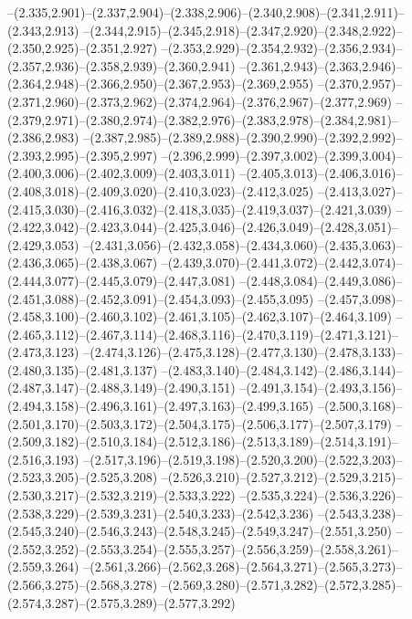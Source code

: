   --(2.335,2.901)--(2.337,2.904)--(2.338,2.906)--(2.340,2.908)--(2.341,2.911)--(2.343,2.913)%
  --(2.344,2.915)--(2.345,2.918)--(2.347,2.920)--(2.348,2.922)--(2.350,2.925)--(2.351,2.927)%
  --(2.353,2.929)--(2.354,2.932)--(2.356,2.934)--(2.357,2.936)--(2.358,2.939)--(2.360,2.941)%
  --(2.361,2.943)--(2.363,2.946)--(2.364,2.948)--(2.366,2.950)--(2.367,2.953)--(2.369,2.955)%
  --(2.370,2.957)--(2.371,2.960)--(2.373,2.962)--(2.374,2.964)--(2.376,2.967)--(2.377,2.969)%
  --(2.379,2.971)--(2.380,2.974)--(2.382,2.976)--(2.383,2.978)--(2.384,2.981)--(2.386,2.983)%
  --(2.387,2.985)--(2.389,2.988)--(2.390,2.990)--(2.392,2.992)--(2.393,2.995)--(2.395,2.997)%
  --(2.396,2.999)--(2.397,3.002)--(2.399,3.004)--(2.400,3.006)--(2.402,3.009)--(2.403,3.011)%
  --(2.405,3.013)--(2.406,3.016)--(2.408,3.018)--(2.409,3.020)--(2.410,3.023)--(2.412,3.025)%
  --(2.413,3.027)--(2.415,3.030)--(2.416,3.032)--(2.418,3.035)--(2.419,3.037)--(2.421,3.039)%
  --(2.422,3.042)--(2.423,3.044)--(2.425,3.046)--(2.426,3.049)--(2.428,3.051)--(2.429,3.053)%
  --(2.431,3.056)--(2.432,3.058)--(2.434,3.060)--(2.435,3.063)--(2.436,3.065)--(2.438,3.067)%
  --(2.439,3.070)--(2.441,3.072)--(2.442,3.074)--(2.444,3.077)--(2.445,3.079)--(2.447,3.081)%
  --(2.448,3.084)--(2.449,3.086)--(2.451,3.088)--(2.452,3.091)--(2.454,3.093)--(2.455,3.095)%
  --(2.457,3.098)--(2.458,3.100)--(2.460,3.102)--(2.461,3.105)--(2.462,3.107)--(2.464,3.109)%
  --(2.465,3.112)--(2.467,3.114)--(2.468,3.116)--(2.470,3.119)--(2.471,3.121)--(2.473,3.123)%
  --(2.474,3.126)--(2.475,3.128)--(2.477,3.130)--(2.478,3.133)--(2.480,3.135)--(2.481,3.137)%
  --(2.483,3.140)--(2.484,3.142)--(2.486,3.144)--(2.487,3.147)--(2.488,3.149)--(2.490,3.151)%
  --(2.491,3.154)--(2.493,3.156)--(2.494,3.158)--(2.496,3.161)--(2.497,3.163)--(2.499,3.165)%
  --(2.500,3.168)--(2.501,3.170)--(2.503,3.172)--(2.504,3.175)--(2.506,3.177)--(2.507,3.179)%
  --(2.509,3.182)--(2.510,3.184)--(2.512,3.186)--(2.513,3.189)--(2.514,3.191)--(2.516,3.193)%
  --(2.517,3.196)--(2.519,3.198)--(2.520,3.200)--(2.522,3.203)--(2.523,3.205)--(2.525,3.208)%
  --(2.526,3.210)--(2.527,3.212)--(2.529,3.215)--(2.530,3.217)--(2.532,3.219)--(2.533,3.222)%
  --(2.535,3.224)--(2.536,3.226)--(2.538,3.229)--(2.539,3.231)--(2.540,3.233)--(2.542,3.236)%
  --(2.543,3.238)--(2.545,3.240)--(2.546,3.243)--(2.548,3.245)--(2.549,3.247)--(2.551,3.250)%
  --(2.552,3.252)--(2.553,3.254)--(2.555,3.257)--(2.556,3.259)--(2.558,3.261)--(2.559,3.264)%
  --(2.561,3.266)--(2.562,3.268)--(2.564,3.271)--(2.565,3.273)--(2.566,3.275)--(2.568,3.278)%
  --(2.569,3.280)--(2.571,3.282)--(2.572,3.285)--(2.574,3.287)--(2.575,3.289)--(2.577,3.292)%

